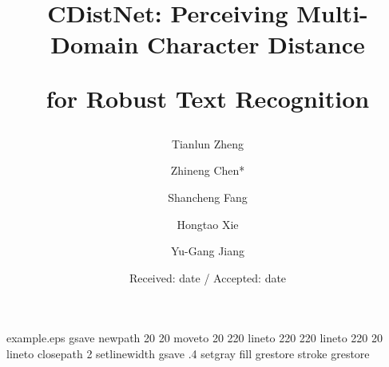 \begin{filecontents*}{example.eps}
gsave
newpath
  20 20 moveto
  20 220 lineto
  220 220 lineto
  220 20 lineto
closepath
2 setlinewidth
gsave
  .4 setgray fill
grestore
stroke
grestore
\end{filecontents*}
\RequirePackage{fix-cm}
\documentclass[twocolumn]{svjour3}          \smartqed  \usepackage[colorlinks,linkcolor=red, citecolor=blue]{hyperref}
\usepackage{graphicx}
\usepackage{cite}
\usepackage{subcaption}
\usepackage{color}
\usepackage{amssymb}
\usepackage[ruled]{algorithm2e} 
\usepackage{url}
\usepackage{multirow}
\usepackage{indentfirst} 
\usepackage{natbib}
\usepackage{amsmath,amssymb}


\title{CDistNet: Perceiving Multi-Domain Character Distance

for Robust Text Recognition}

\author{
Tianlun Zheng \and Zhineng Chen* \and Shancheng Fang \and Hongtao Xie \and Yu-Gang Jiang
}










\date{Received: date / Accepted: date}



\maketitle

